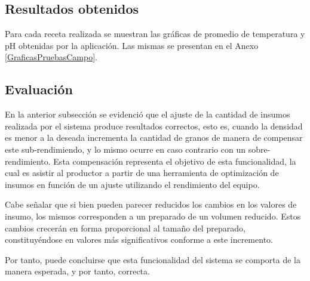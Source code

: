     
    \subsection{Resultados obtenidos}
        \par Para cada receta realizada se muestran las gráficas de promedio de temperatura y pH obtenidas por la aplicación. Las mismas se presentan en el Anexo \ref{GraficasPruebasCampo}.
    
    \subsection{Evaluación}
        \par En la anterior subsección se evidenció que el ajuste de la cantidad de insumos realizada por el sistema produce resultados correctos, esto es, cuando la densidad es menor a la deseada incrementa la cantidad de granos de manera de compensar este sub-rendimiendo, y lo mismo ocurre en caso contrario con un sobre-rendimiento. Esta compensación representa el objetivo de esta funcionalidad, la cual es asistir al productor a partir de una herramienta de optimización de insumos en función de un ajuste utilizando el rendimiento del equipo.
        
        \par Cabe señalar que si bien pueden parecer reducidos los cambios en los valores de insumo, los mismos corresponden a un preparado de un volumen reducido. Estos cambios crecerán en forma proporcional al tamaño del preparado, constituyéndose en valores más significativos conforme a este incremento.
        
        \par Por tanto, puede concluirse que esta funcionalidad del sistema se comporta de la manera esperada, y por tanto, correcta. 
    
    
        
        
